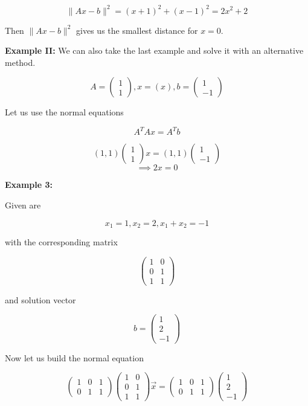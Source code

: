 \[
\| Ax - b \|^2 = (x + 1)^2 + (x - 1)^2 = 2x^2 + 2 
\]

Then \(\| Ax - b \|^2\) gives us the smallest distance for \(x = 0\).
\vspace{\baselineskip}

\textbf{Example II:}
\vspace{\baselineskip}
We can also take the last example and solve it with an alternative method.

\[
A = \begin{pmatrix} 1 \\ 1 \end{pmatrix}, x = (x), b = \begin{pmatrix} 1 \\ -1 \end{pmatrix}
\]

Let us use the normal equations

\[
A^T Ax = A^T b
\]

\[
(1, 1) 
\begin{pmatrix} 
1 \\ 
1
\end{pmatrix} x
= 
(1, 1)
\begin{pmatrix} 
	1 \\ 
	-1
\end{pmatrix} 
\]
\[
\implies 2x = 0
\]

\textbf{Example 3:}
\vspace{\baselineskip}

Given are 

\[
x_1 = 1, x_2 = 2, x_1 + x_2 = -1
\]

with the corresponding matrix

\[
\begin{pmatrix}
	1 & 0 \\
	0 & 1 \\
	1 & 1  
\end{pmatrix}
\]

and solution vector 

\[
b = \begin{pmatrix}
	1 \\
	2 \\
	-1
\end{pmatrix}
\]

Now let us build the normal equation

\[
\begin{pmatrix}
1 & 0 & 1 \\
0 & 1 & 1
\end{pmatrix}
\begin{pmatrix}
1 & 0 \\
0 & 1 \\
1 & 1  
\end{pmatrix}
\vec{x}
=
\begin{pmatrix}
1 & 0 & 1 \\
0 & 1 & 1
\end{pmatrix}
\begin{pmatrix}
1 \\
2 \\
-1
\end{pmatrix}
\]

